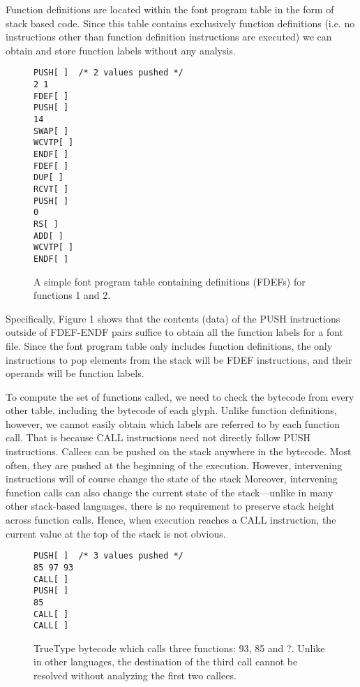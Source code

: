 \documentclass[12pt]{article}
\begin{document}
Function definitions are located within the font program table in the
form of stack based code. Since this table contains exclusively function
definitions (i.e. no instructions other than function definition
instructions are executed) we can obtain and store function labels without
any analysis.

\begin{figure}[ht!]
  \begin{center}
  \begin{minipage}{.4\textwidth}
\begin{verbatim}
PUSH[ ]  /* 2 values pushed */
2 1
FDEF[ ]
PUSH[ ]
14
SWAP[ ]
WCVTP[ ]
ENDF[ ]
FDEF[ ]
DUP[ ]
RCVT[ ]
PUSH[ ]
0
RS[ ]
ADD[ ]
WCVTP[ ]
ENDF[ ]
\end{verbatim}
  \end{minipage}
  \end{center}
\caption{A simple font program table containing definitions (FDEFs) for functions 1 and 2.}
\end{figure}

Specifically, Figure 1 shows that the contents (data) of
the PUSH instructions outside of FDEF-ENDF pairs suffice to obtain all the
function labels for a font file. Since the font program table only
includes function definitions, the only instructions to pop
elements from the stack will be FDEF instructions, and their operands
will be function labels.

To compute the set of functions called, we need to check the bytecode from every
other table, including the bytecode of each glyph. Unlike function
definitions, however, we cannot easily obtain which labels are referred to by each
function call. That is because CALL instructions need not directly follow
PUSH instructions. Callees can be pushed on the stack anywhere in the
bytecode. Most often, they are pushed at the beginning of the
execution. However, intervening instructions will of course change the state of the stack
Moreover, intervening function calls can also change the current state of the stack---unlike
in many other stack-based languages, there is no requirement to preserve stack height across
function calls. Hence, when execution reaches a CALL instruction, the current value at the
top of the stack is not obvious.

\begin{figure}[ht!]
\begin{verbatim}
PUSH[ ]  /* 3 values pushed */
85 97 93
CALL[ ]
PUSH[ ]
85
CALL[ ]
CALL[ ]
\end{verbatim}
\caption{TrueType bytecode which calls three functions: 93, 85 and ?.
Unlike in other languages, the destination of the third call cannot be resolved
without analyzing the first two callees.}
\end{figure}
\end{document}
